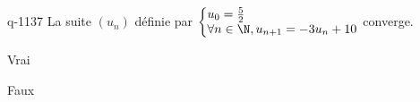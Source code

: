 \begin{truefalse}{q-1137}
La suite $(u_n)$ définie par $\left\{ \begin{array}{@{} l @{}} u_0 = \frac 52 \\ \forall n\in \N, u_{n+1}=-3u_{n}+10 \end{array} \right.$ converge.
\item* Vrai
\item Faux
\end{truefalse}

